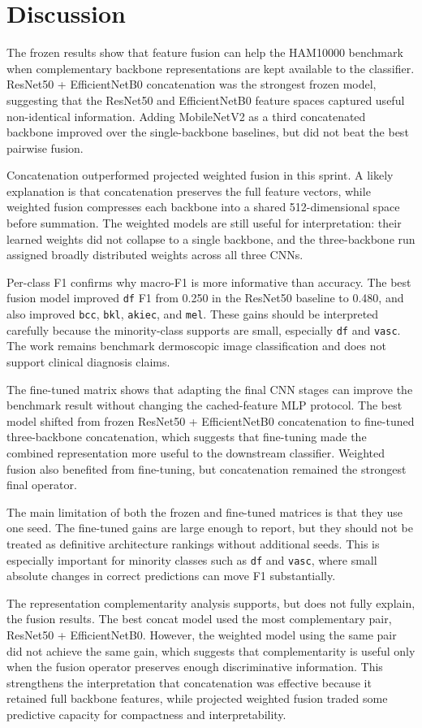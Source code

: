 \section{Discussion}

The frozen results show that feature fusion can help the HAM10000 benchmark when complementary backbone representations are kept available to the classifier. ResNet50 + EfficientNetB0 concatenation was the strongest frozen model, suggesting that the ResNet50 and EfficientNetB0 feature spaces captured useful non-identical information. Adding MobileNetV2 as a third concatenated backbone improved over the single-backbone baselines, but did not beat the best pairwise fusion.

Concatenation outperformed projected weighted fusion in this sprint. A likely explanation is that concatenation preserves the full feature vectors, while weighted fusion compresses each backbone into a shared 512-dimensional space before summation. The weighted models are still useful for interpretation: their learned weights did not collapse to a single backbone, and the three-backbone run assigned broadly distributed weights across all three CNNs.

Per-class F1 confirms why macro-F1 is more informative than accuracy. The best fusion model improved \texttt{df} F1 from 0.250 in the ResNet50 baseline to 0.480, and also improved \texttt{bcc}, \texttt{bkl}, \texttt{akiec}, and \texttt{mel}. These gains should be interpreted carefully because the minority-class supports are small, especially \texttt{df} and \texttt{vasc}. The work remains benchmark dermoscopic image classification and does not support clinical diagnosis claims.

The fine-tuned matrix shows that adapting the final CNN stages can improve the benchmark result
without changing the cached-feature MLP protocol. The best model shifted from frozen ResNet50 +
EfficientNetB0 concatenation to fine-tuned three-backbone concatenation, which suggests that
fine-tuning made the combined representation more useful to the downstream classifier. Weighted
fusion also benefited from fine-tuning, but concatenation remained the strongest final operator.

The main limitation of both the frozen and fine-tuned matrices is that they use one seed. The
fine-tuned gains are large enough to report, but they should not be treated as definitive
architecture rankings without additional seeds. This is especially important for minority classes
such as \texttt{df} and \texttt{vasc}, where small absolute changes in correct predictions can move
F1 substantially.

The representation complementarity analysis supports, but does not fully explain, the fusion results. The best concat model used the most complementary pair, ResNet50 + EfficientNetB0. However, the weighted model using the same pair did not achieve the same gain, which suggests that complementarity is useful only when the fusion operator preserves enough discriminative information. This strengthens the interpretation that concatenation was effective because it retained full backbone features, while projected weighted fusion traded some predictive capacity for compactness and interpretability.
